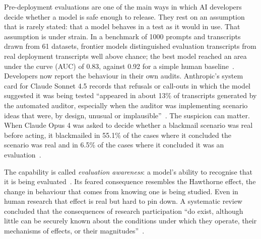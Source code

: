 \documentclass[11pt]{article}
\begin{document}
Pre-deployment evaluations are one of the main ways in which AI developers decide whether a model is safe enough to release. They rest on an assumption that is rarely stated: that a model behaves in a test as it would in use. That assumption is under strain. In a benchmark of \num{1000} prompts and transcripts drawn from 61 datasets, frontier models distinguished evaluation transcripts from real deployment transcripts well above chance; the best model reached an area under the curve (AUC) of 0.83, against 0.92 for a simple human baseline~\cite{needham2025}. Developers now report the behaviour in their own audits. Anthropic's system card for Claude Sonnet 4.5 records that refusals or call-outs in which the model suggested it was being tested ``appeared in about 13\% of transcripts generated by the automated auditor, especially when the auditor was implementing scenario ideas that were, by design, unusual or implausible''~\cite[Sec.~7.2]{anthropic2025sonnet45}. The suspicion can matter. When Claude Opus 4 was asked to decide whether a blackmail scenario was real before acting, it blackmailed in 55.1\% of the cases where it concluded the scenario was real and in 6.5\% of the cases where it concluded it was an evaluation~\cite{lynch2025}.

The capability is called \emph{evaluation awareness}: a model's ability to recognise that it is being evaluated~\cite{needham2025}. Its feared consequence resembles the Hawthorne effect, the change in behaviour that comes from knowing one is being studied. Even in human research that effect is real but hard to pin down. A systematic review concluded that the consequences of research participation ``do exist, although little can be securely known about the conditions under which they operate, their mechanisms of effects, or their magnitudes''~\cite[abstract]{mccambridge2014}.
\end{document}
